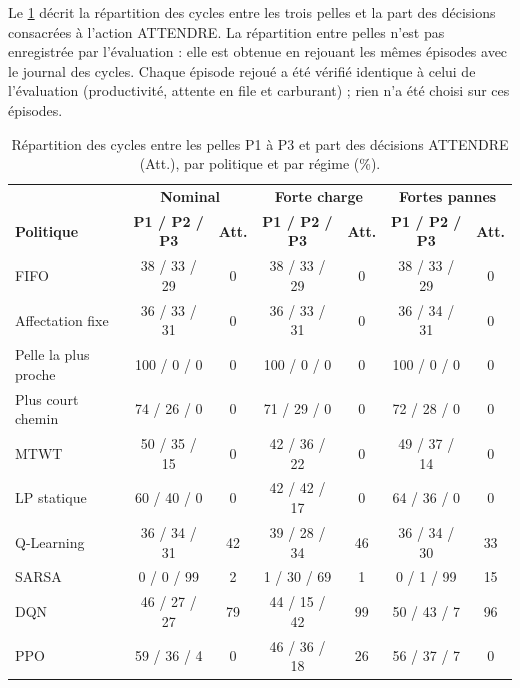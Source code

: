 \documentclass[11pt,a4paper]{article}
\newif\ifrevmarks
\newcommand{\revtag}[1]{\ifrevmarks\textsuperscript{\textcolor{red!70!black}{\scriptsize[#1]}}\fi}
\newenvironment{revbloc}[1]{\par\ifrevmarks\color{revcolor}\noindent\revtag{#1}\ \fi}{\par}
\newif\ifcorrmarks
\newcommand{\corr}[1]{\ifcorrmarks\textcolor{corrcolor}{#1}\else#1\fi}
\begin{document}
\begin{revbloc}{T31}
Le \cref{tab:behaviour} décrit la répartition des cycles entre les trois pelles et la part des décisions consacrées à l'action ATTENDRE. La répartition entre pelles n'est pas enregistrée par l'évaluation : elle est obtenue en rejouant les mêmes épisodes avec le journal des cycles. Chaque épisode rejoué a été vérifié identique à celui de l'évaluation (productivité, attente en file et carburant) ; rien n'a été choisi sur ces épisodes.

\begin{table}[H]
\centering
\caption{Répartition des cycles entre les pelles P1 à P3 et part des décisions ATTENDRE (Att.), par politique et par régime (\%).}
\label{tab:behaviour}
\footnotesize
\setlength{\tabcolsep}{4pt}
\begin{tabular}{lcc|cc|cc}
\toprule
 & \multicolumn{2}{c|}{\textbf{Nominal}} & \multicolumn{2}{c|}{\textbf{Forte charge}} & \multicolumn{2}{c}{\textbf{Fortes pannes}} \\
\textbf{Politique} & \textbf{P1 / P2 / P3} & \textbf{Att.} & \textbf{P1 / P2 / P3} & \textbf{Att.} & \textbf{P1 / P2 / P3} & \textbf{Att.} \\
\midrule
FIFO                 & 38 / 33 / 29 & 0 & 38 / 33 / 29 & 0 & 38 / 33 / 29 & 0 \\
Affectation fixe     & 36 / 33 / 31 & 0 & 36 / 33 / 31 & 0 & 36 / 34 / 31 & 0 \\
Pelle la plus proche & 100 / 0 / 0 & 0 & 100 / 0 / 0 & 0 & 100 / 0 / 0 & 0 \\
Plus court chemin    & 74 / 26 / 0 & 0 & 71 / 29 / 0 & 0 & 72 / 28 / 0 & 0 \\
MTWT                 & 50 / 35 / 15 & 0 & 42 / 36 / 22 & 0 & 49 / 37 / 14 & 0 \\
\corr{LP statique}                   & 60 / 40 / 0 & 0 & 42 / 42 / 17 & 0 & 64 / 36 / 0 & 0 \\
\midrule
Q-Learning           & 36 / 34 / 31 & 42 & 39 / 28 / 34 & 46 & 36 / 34 / 30 & 33 \\
SARSA                & 0 / 0 / 99 & 2 & 1 / 30 / 69 & 1 & 0 / 1 / 99 & 15 \\
DQN                  & 46 / 27 / 27 & 79 & 44 / 15 / 42 & 99 & 50 / 43 / 7 & 96 \\
PPO                  & 59 / 36 / 4 & 0 & 46 / 36 / 18 & 26 & 56 / 37 / 7 & 0 \\
\bottomrule
\end{tabular}
\end{table}


\end{revbloc}
\end{document}
